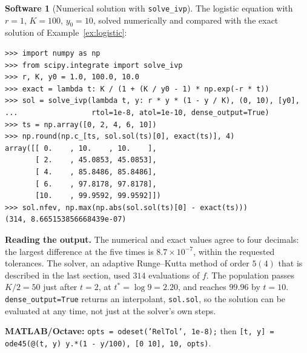 \documentclass[11pt,a4paper]{article}
\numberwithin{equation}{section}
\theoremstyle{definition}
\newtheorem{software}[thm]{Software}
\begin{document}
\begin{software}[Numerical solution with \texttt{solve\_ivp}]
\label{sw:solveivp1}
The logistic equation with $r = 1$, $K = 100$, $y_0 = 10$, solved numerically and compared with the exact solution of Example~\ref{ex:logistic}:
{\small\begin{verbatim}
>>> import numpy as np
>>> from scipy.integrate import solve_ivp
>>> r, K, y0 = 1.0, 100.0, 10.0
>>> exact = lambda t: K / (1 + (K / y0 - 1) * np.exp(-r * t))
>>> sol = solve_ivp(lambda t, y: r * y * (1 - y / K), (0, 10), [y0],
...                 rtol=1e-8, atol=1e-10, dense_output=True)
>>> ts = np.array([0, 2, 4, 6, 10])
>>> np.round(np.c_[ts, sol.sol(ts)[0], exact(ts)], 4)
array([[ 0.    , 10.    , 10.    ],
       [ 2.    , 45.0853, 45.0853],
       [ 4.    , 85.8486, 85.8486],
       [ 6.    , 97.8178, 97.8178],
       [10.    , 99.9592, 99.9592]])
>>> sol.nfev, np.max(np.abs(sol.sol(ts)[0] - exact(ts)))
(314, 8.665153856668439e-07)
\end{verbatim}}
\textbf{Reading the output.} The numerical and exact values agree to four decimals: the largest difference at the five times is $8.7 \times 10^{-7}$, within the requested
tolerances. The solver, an adaptive Runge--Kutta method of order $5(4)$ that is described in the last section, used $314$ evaluations of $f$. The population passes
$K/2 = 50$ just after $t = 2$, at $t^* = \log 9 = 2.20$, and reaches $99.96$ by $t = 10$. \texttt{dense\_output=True} returns an interpolant, \texttt{sol.sol}, so the solution can be
evaluated at any time, not just at the solver's own steps.

\textbf{MATLAB/Octave:} \texttt{opts = odeset('RelTol', 1e-8);} then \texttt{[t, y] = ode45(@(t, y) y.*(1 - y/100), [0 10], 10, opts)}.
\end{software}
\end{document}
